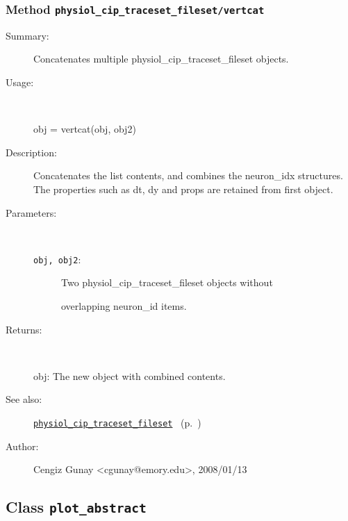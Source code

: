 \subsubsection[Method \texttt{vertcat}]{Method \texttt{physiol\_cip\_traceset\_fileset/vertcat}}%
%
\label{ref_physiol_cip_traceset_fileset__vertcat}%
\hypertarget{ref_physiol_cip_traceset_fileset__vertcat}{}%
\begin{description}
\item[Summary:]Concatenates multiple physiol\_cip\_traceset\_fileset objects.
%
\item[Usage:]~%
\begin{lyxcode}%
obj = vertcat(obj, obj2)
%
\end{lyxcode}%
%
\item[Description:]%
Concatenates the list contents, and combines the neuron\_idx
 structures. The properties such as dt, dy and props are retained from
 first object.
\item[Parameters:]~
\begin{description}%
\item[\texttt{obj, obj2}:]
 Two physiol\_cip\_traceset\_fileset objects without

overlapping neuron\_id items.
\end{description}%
%
\item[Returns:
]~

   obj: The new object with combined contents.
%
%
\item[See also:]%
\hyperlink{ref_physiol_cip_traceset_fileset}{\texttt{physiol\_cip\_traceset\_fileset}}%
\ (p.~\pageref{ref_physiol_cip_traceset_fileset})%
%
%
\item[Author:]%
Cengiz Gunay <cgunay@emory.edu>, 2008/01/13
%
\end{description}
\methodline%
\subsection{Class \texttt{plot\_abstract}}%
%
\label{ref_plot_abstract}%
\hypertarget{ref_plot_abstract}{}%
